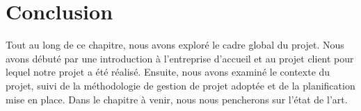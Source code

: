 \section{Conclusion}

\quad Tout au long de ce chapitre, nous avons exploré le cadre global du projet. Nous avons débuté par une introduction à l'entreprise d'accueil et au projet client pour lequel notre projet a été réalisé. Ensuite, nous avons examiné le contexte du projet, suivi de la méthodologie de gestion de projet adoptée et de la planification mise en place. Dans le chapitre à venir, nous nous pencherons sur l'état de l'art.








